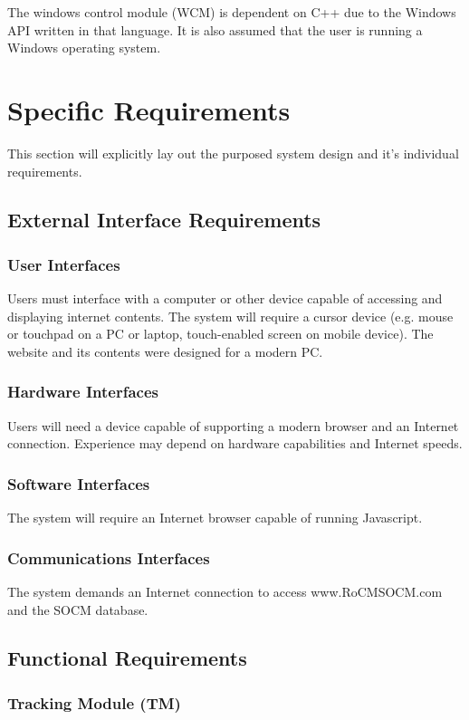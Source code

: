 \documentclass[titlepage]{article}
\begin{document}
The windows control module (WCM) is dependent on C++ due to the Windows API written in that language. It is also assumed that the user is running a Windows operating system.

\section{Specific Requirements}
\label{Specific Requirements}
This section will explicitly lay out the purposed system design and it's individual requirements.

\subsection{External Interface Requirements}
\subsubsection{User Interfaces}
Users must interface with a computer or other device capable of accessing and displaying internet contents. The system will require a cursor device (e.g. mouse or touchpad on a PC or laptop, touch-enabled screen on mobile device). The website and its contents were designed for a modern PC.

\subsubsection{Hardware Interfaces}
Users will need a device capable of supporting a modern browser and an Internet connection. Experience may depend on hardware capabilities and Internet speeds.

\subsubsection{Software Interfaces}
The system will require an Internet browser capable of running Javascript.

\subsubsection{Communications Interfaces}
The system demands an Internet connection to access www.RoCMSOCM.com and the SOCM database.

\subsection{Functional Requirements}
\subsubsection{Tracking Module (TM)}
\end{document}
